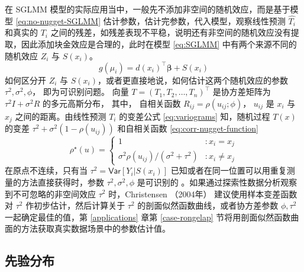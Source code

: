 \documentclass[12pt,a4paper,UTF8,twoside]{book}
\theoremstyle{definition}
\theoremstyle{definition}
\theoremstyle{definition}
\theoremstyle{remark}
\begin{document}
在 SGLMM 模型的实际应用当中，一般先不添加非空间的随机效应，而是基于模型 \eqref{eq:no-nugget-SGLMM} 估计参数，估计完参数，代入模型，观察线性预测 \(\hat{T_{i}}\) 和真实的 \(T_i\) 之间的残差，如残差表现不平稳，说明还有非空间的随机效应没有提取，因此添加块金效应是合理的，此时在模型 \eqref{eq:SGLMM} 中有两个来源不同的随机效应 \(Z_{i}\) 与 \(S(x_i)\)。
\begin{equation}
g(\mu_i) = d(x_i)^{\top}\boldsymbol{\beta} + S(x_i) \label{eq:no-nugget-SGLMM}
\end{equation}
如何区分开 \(Z_{i}\) 与 \(S(x_i)\)，或者更直接地说，如何估计这两个随机效应的参数 \(\tau^2, \sigma^2, \phi\)， 即为可识别问题。 向量 \(T = (T_1,T_2,\ldots,T_n)^{\top}\) 是协方差矩阵为 \(\tau^2I + \sigma^2R\) 的多元高斯分布， 其中， 自相关函数 \(R_{ij} = \rho(u_{ij}; \phi)\)， \(u_{ij}\) 是 \(x_i\) 与 \(x_j\) 之间的距离。由线性预测 \(T_{i}\) 的变差公式 \eqref{eq:variograms} 知，随机过程 \(T(x)\) 的变差 \(\tau^2 + \sigma^2(1-\rho(u_{ij}))\) 和自相关函数 \eqref{eq:corr-nugget-function}
\begin{equation}
\rho^{\star}(u) =
\begin{cases}
                                     1 & : x_{i} = x_{j}  \\
\sigma^2\rho(u_{ij})/(\sigma^2+\tau^2) & : x_{i} \neq x_{j}
\end{cases} \label{eq:corr-nugget-function}
\end{equation}
\noindent 在原点不连续，只有当 \(\tau^2 = \mathsf{Var}[Y_i|S(x_i)]\) 已知或者在同一位置可以用重复测量的方法直接获得时，参数 \(\tau^2, \sigma^2, \phi\) 是可识别的 \citep{Diggle2002Childhood, Diggle2007}。如果通过探索性数据分析观察到不可忽略的非空间效应 \(\tau^2\) 时，Christensen （2004年） \citep{Christensen2004} 建议使用样本变差函数对 \(\tau^2\) 作初步估计，然后计算关于 \(\tau^2\) 的剖面似然函数曲线，或者协方差参数 \(\phi,\tau^2\)一起确定最佳的值，第 \ref{applications} 章第 \ref{case-rongelap} 节将用剖面似然函数曲面的方法获取真实数据场景中的参数估计值。

\hypertarget{subsec:prior-sglmm}{%
\subsection{先验分布}\label{subsec:prior-sglmm}}
\end{document}
